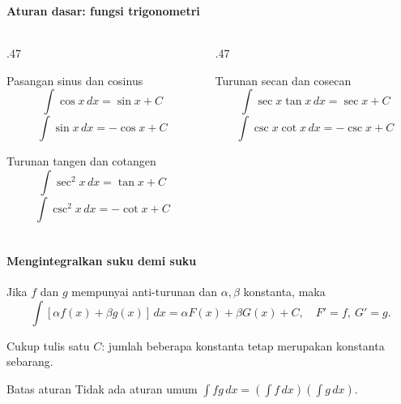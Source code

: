 \documentclass{../../kalkulus-ppt}
\begin{document}
\begin{frame}
\frametitle{\insertsection}
\framesubtitle{Aturan dasar: fungsi trigonometri}

\begin{columns}[t]
\begin{column}{.47\textwidth}
\begin{block}{Pasangan sinus dan cosinus}
\[\int\cos x\,dx=\sin x+C\]
\[\int\sin x\,dx=-\cos x+C\]
\end{block}
\begin{block}{Turunan tangen dan cotangen}
\[\int\sec^2x\,dx=\tan x+C\]
\[\int\csc^2x\,dx=-\cot x+C\]
\end{block}
\end{column}
\begin{column}{.47\textwidth}
\begin{block}{Turunan secan dan cosecan}
\[\int\sec x\tan x\,dx=\sec x+C\]
\[\int\csc x\cot x\,dx=-\csc x+C\]
\end{block}
\end{column}\end{columns}
\end{frame}

\begin{frame}
\frametitle{\insertsection}
\framesubtitle{Mengintegralkan suku demi suku}

\begin{teorema}
Jika $f$ dan $g$ mempunyai anti-turunan dan $\alpha,\beta$ konstanta, maka
\[\int[\alpha f(x)+\beta g(x)]\,dx
=\alpha F(x)+\beta G(x)+C,\quad F'=f,\ G'=g.\]
\end{teorema}
Cukup tulis satu $C$: jumlah beberapa konstanta tetap merupakan konstanta sebarang.
\begin{alertblock}{Batas aturan}
Tidak ada aturan umum $\int fg\,dx=(\int f\,dx)(\int g\,dx)$.
\end{alertblock}
\end{frame}
\end{document}
